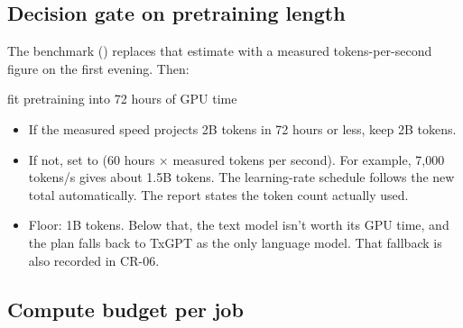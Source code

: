 \subsection{Decision gate on pretraining length}
\label{sec:gate}

The benchmark () replaces
that estimate with a measured tokens-per-second figure on the first evening. Then:

\begin{decision}{fit pretraining into 72 hours of GPU time}
\begin{itemize}[leftmargin=*]
  \item If the measured speed projects 2B tokens in 72 hours or less, keep 2B tokens.
  \item If not, set  to (60 hours × measured tokens per second). For example,
    7,000 tokens/s gives about 1.5B tokens. The learning-rate schedule follows the new total
    automatically. The report states the token count actually used.
  \item Floor: 1B tokens. Below that, the text model isn't worth its GPU time, and the plan falls
    back to TxGPT as the only language model. That fallback is also recorded in CR-06.
\end{itemize}
\end{decision}

\subsection{Compute budget per job}

